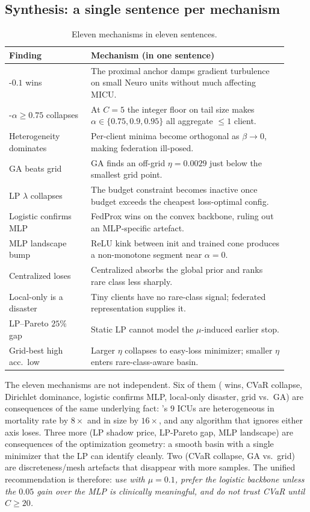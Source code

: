 \subsection{Synthesis: a single sentence per mechanism}
\label{sec:mechanism-synthesis}

\begin{table}[t]
\centering
\caption{Eleven mechanisms in eleven sentences.}
\label{tab:mechanisms}
\small
\begin{tabular}{p{0.27\linewidth} p{0.65\linewidth}}
\toprule
\textbf{Finding} & \textbf{Mechanism (in one sentence)} \\
\midrule
\fedprox{}-$0.1$ wins & The proximal anchor damps gradient turbulence on small Neuro units without much affecting MICU. \\
\cvar{}-$\alpha\!\geq\!0.75$ collapses & At $C\!=\!5$ the integer floor on tail size makes $\alpha\!\in\!\{0.75,0.9,0.95\}$ all aggregate $\leq 1$ client. \\
Heterogeneity dominates & Per-client minima become orthogonal as $\beta\!\to\!0$, making federation ill-posed. \\
GA beats grid & GA finds an off-grid $\eta\!=\!0.0029$ just below the smallest grid point. \\
LP $\lambda$ collapses & The budget constraint becomes inactive once budget exceeds the cheapest loss-optimal config. \\
Logistic confirms MLP & FedProx wins on the convex backbone, ruling out an MLP-specific artefact. \\
MLP landscape bump & ReLU kink between init and trained cone produces a non-monotone segment near $\alpha\!=\!0$. \\
Centralized loses \auprc{} & Centralized absorbs the global prior and ranks rare class less sharply. \\
Local-only is a disaster & Tiny clients have no rare-class signal; federated representation supplies it. \\
LP--Pareto $25\%$ gap & Static LP cannot model the $\mu$-induced earlier stop. \\
Grid-best high acc.\ low \auprc{} & Larger $\eta$ collapses to easy-loss minimizer; smaller $\eta$ enters rare-class-aware basin. \\
\bottomrule
\end{tabular}
\end{table}

The eleven mechanisms are not independent. Six of them
(\fedprox{} wins, CVaR collapse, Dirichlet dominance, logistic confirms MLP,
local-only disaster, grid vs.\ GA) are consequences of the same underlying
fact: \mimic{}'s $9$ ICUs are heterogeneous in mortality rate by $8\!\times$
and in size by $16\!\times$, and any algorithm that ignores either axis loses.
Three more (LP shadow price, LP-Pareto gap, MLP landscape) are consequences
of the optimization geometry: a smooth basin with a single minimizer that the
LP can identify cleanly. Two (CVaR collapse, GA vs.\ grid) are
discreteness/mesh artefacts that disappear with more samples. The unified
recommendation is therefore: \emph{use \fedprox{} with $\mu \!=\! 0.1$, prefer
the logistic backbone unless the $0.05$ \auprc{} gain over the MLP is
clinically meaningful, and do not trust CVaR until $C \geq 20$.}
